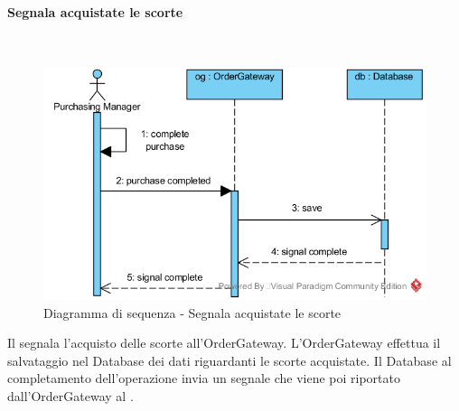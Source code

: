 \begin{samepage}
\paragraph{Segnala acquistate le scorte}\mbox{}\\
\end{samepage}
\begin{figure}[H]
	\centering
	\includegraphics[width=14cm]{../../documenti/SpecificaTecnica/diagrammi_img/sequenza/responsabile_acquisti_segnala_scorte_acquistate.png}
	\caption{Diagramma di sequenza - Segnala acquistate le scorte}
\end{figure}
Il \Purchasingmanager{} segnala l'acquisto delle scorte all'Order\-Gateway. L'Order\-Gateway effettua il salvataggio nel Database dei dati riguardanti le scorte acquistate. Il Database al completamento dell'operazione invia un segnale che viene poi riportato dall'Order\-Gateway al \Purchasingmanager{}.

\subsubsection{\Manager{}}


